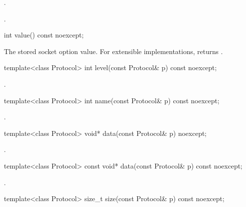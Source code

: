 \begin{itemdescr}
\pnum
\returns {}.

\pnum
\postconditions {}.
\end{itemdescr}

\begin{itemdecl}
int value() const noexcept;
\end{itemdecl}

\begin{itemdescr}
\pnum
\returns The stored socket option value. For extensible implementations, returns .
\end{itemdescr}

\begin{itemdecl}
template<class Protocol> int level(const Protocol& p) const noexcept;
\end{itemdecl}

\begin{itemdescr}
\pnum
\returns {}.
\end{itemdescr}

\begin{itemdecl}
template<class Protocol> int name(const Protocol& p) const noexcept;
\end{itemdecl}

\begin{itemdescr}
\pnum
\returns {}.
\end{itemdescr}

\begin{itemdecl}
template<class Protocol> void* data(const Protocol& p) noexcept;
\end{itemdecl}

\begin{itemdescr}
\pnum
\returns {}.
\end{itemdescr}

\begin{itemdecl}
template<class Protocol> const void* data(const Protocol& p) const noexcept;
\end{itemdecl}

\begin{itemdescr}
\pnum
\returns {}.
\end{itemdescr}

\begin{itemdecl}
template<class Protocol> size_t size(const Protocol& p) const noexcept;
\end{itemdecl}

